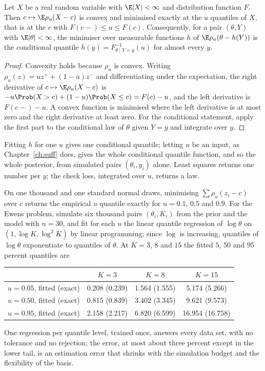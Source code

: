 \begin{lemma}\label{toolkit:lem:check}
Let $X$ be a real random variable with $\E|X|<\infty$ and distribution function $F$. Then
$c\mapsto\E\rho_u(X-c)$ is convex and minimised exactly at the $u$ quantiles of $X$, that is at
the $c$ with $F(c-)\le u\le F(c)$. Consequently, for a pair $(\theta,Y)$ with $\E|\theta|<\infty$,
the minimiser over measurable functions $h$ of $\E\rho_u(\theta-h(Y))$ is the conditional quantile
$h(y)=F^{-1}_{\theta\mid Y=y}(u)$ for almost every $y$.
\end{lemma}

\begin{proof}
Convexity holds because $\rho_u$ is convex. Writing $\rho_u(z)=uz^+ +(1-u)z^-$ and differentiating
under the expectation, the right derivative of $c\mapsto\E\rho_u(X-c)$ is
$-u\Prob(X>c)+(1-u)\Prob(X\le c)=F(c)-u$, and the left derivative is $F(c-)-u$. A convex function
is minimised where the left derivative is at most zero and the right derivative at least zero.
For the conditional statement, apply the first part to the conditional law of $\theta$ given
$Y=y$ and integrate over $y$.
\end{proof}

Fitting $h$ for one $u$ gives one conditional quantile; letting $u$ be an input, as
Chapter~\ref{ch:suff} does, gives the whole conditional quantile function, and so the whole
posterior, from simulated pairs $(\theta_i,y_i)$ alone. Least squares returns one number per $y$;
the check loss, integrated over $u$, returns a law.

\begin{example}\label{toolkit:ex:qr}
On one thousand and one standard normal draws, minimising $\sum\rho_u(z_i-c)$ over $c$ returns the
empirical $u$ quantile exactly for $u=0.1$, $0.5$ and $0.9$. For the Ewens problem, simulate six
thousand pairs $(\theta_i,K_i)$ from the prior and the model with $n=30$, and fit for each $u$ the
linear quantile regression of $\log\theta$ on $(1,\log K,\log^2K)$ by linear programming; since
$\log$ is increasing, quantiles of $\log\theta$ exponentiate to quantiles of $\theta$. At
$K=3$, $8$ and $15$ the fitted $5$, $50$ and $95$ percent quantiles are
\begin{center}\small
\begin{tabular}{lccc}
\toprule
& $K=3$ & $K=8$ & $K=15$\\
\midrule
$u=0.05$, fitted (exact) & 0.208 (0.239) & 1.564 (1.555) & 5.174 (5.266)\\
$u=0.50$, fitted (exact) & 0.815 (0.839) & 3.402 (3.345) & 9.621 (9.573)\\
$u=0.95$, fitted (exact) & 2.158 (2.217) & 6.820 (6.599) & 16.954 (16.758)\\
\bottomrule
\end{tabular}
\end{center}
One regression per quantile level, trained once, answers every data set, with no tolerance and no
rejection; the error, at most about three percent except in the lower tail, is an estimation error
that shrinks with the simulation budget and the flexibility of the basis.
\end{example}

